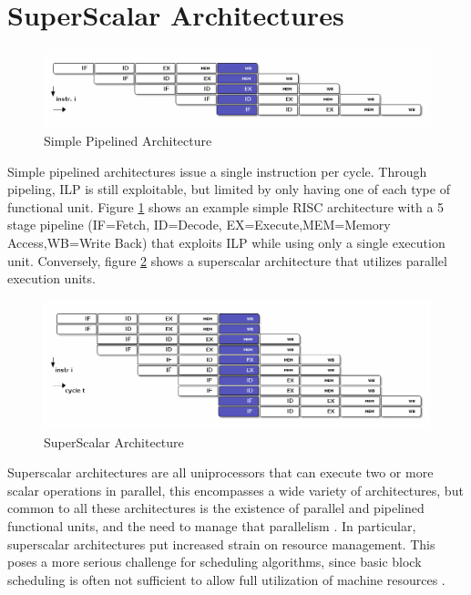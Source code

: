 \documentclass[12pt]{report}
\begin{document}
\section{SuperScalar Architectures}
\label{sec:org134dc99}

\begin{figure}[htbp]
\centering
\includegraphics[width=1.0\textwidth]{figures/RISCPipeline.png}
\caption{\label{fig:PipelinedArchitecture}
Simple Pipelined Architecture}
\end{figure}


Simple pipelined architectures issue a single instruction per cycle.
Through pipeling, ILP is still exploitable, but limited by only having one of
each type of functional unit. Figure \ref{fig:PipelinedArchitecture} shows an
example simple RISC architecture with a 5 stage pipeline (IF=Fetch,
ID=Decode, EX=Execute,MEM=Memory Access,WB=Write Back) that exploits ILP while using only a single
execution unit. Conversely, figure \ref{fig:SuperScalarArchitecture} shows a
superscalar architecture that utilizes parallel execution units.  

\begin{figure}[htbp]
\centering
\includegraphics[width=1.0\textwidth]{figures/SuperScalarPipeline.png}
\caption{\label{fig:SuperScalarArchitecture}
SuperScalar Architecture}
\end{figure}


Superscalar architectures are all uniprocessors that can execute two or more
scalar operations in parallel, this encompasses a wide variety of
architectures, but common to all these architectures is the existence of
parallel and pipelined functional units, and the need to manage that
parallelism \parencite{zyuban2001inherently}. In particular, superscalar
architectures put increased strain on resource management. This poses a more
serious challenge for scheduling algorithms, since basic block scheduling is
often not sufficient to allow full utilization of machine
resources \parencite{bernstein1991global}. 
\end{document}
